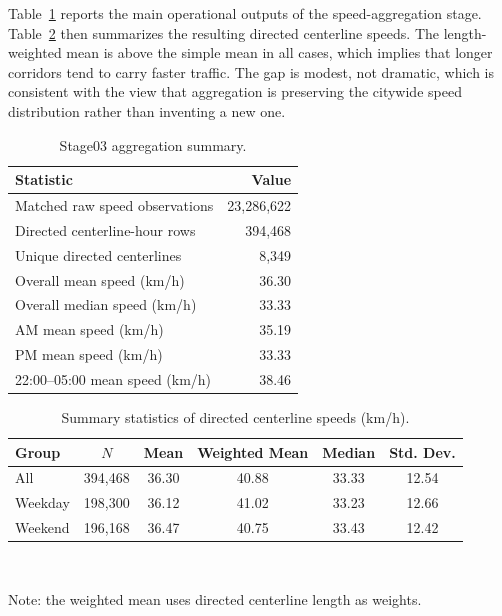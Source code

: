 \documentclass[12pt]{article}
\begin{document}
	Table~\ref{tab:stage03-summary} reports the main operational outputs of the speed-aggregation stage. Table~\ref{tab:centerline-speed-stats} then summarizes the resulting directed centerline speeds. The length-weighted mean is above the simple mean in all cases, which implies that longer corridors tend to carry faster traffic. The gap is modest, not dramatic, which is consistent with the view that aggregation is preserving the citywide speed distribution rather than inventing a new one.
	
	\begin{table}[h!]
		\centering
		\caption{Stage03 aggregation summary.}
		\label{tab:stage03-summary}
		\begin{tabular}{l r}
			\toprule
			Statistic & Value \\
			\midrule
			Matched raw speed observations & 23,286,622 \\
			Directed centerline-hour rows & 394,468 \\
			Unique directed centerlines & 8,349 \\
			Overall mean speed (km/h) & 36.30 \\
			Overall median speed (km/h) & 33.33 \\
			AM mean speed (km/h) & 35.19 \\
			PM mean speed (km/h) & 33.33 \\
			22:00--05:00 mean speed (km/h) & 38.46 \\
			\bottomrule
		\end{tabular}
	\end{table}
	
	\begin{table}[h!]
		\centering
		\caption{Summary statistics of directed centerline speeds (km/h).}
		\label{tab:centerline-speed-stats}
		\begin{tabular}{lccccc}
			\toprule
			Group & $N$ & Mean & Weighted Mean & Median & Std. Dev. \\
			\midrule
			All & 394,468 & 36.30 & 40.88 & 33.33 & 12.54 \\
			Weekday & 198,300 & 36.12 & 41.02 & 33.23 & 12.66 \\
			Weekend & 196,168 & 36.47 & 40.75 & 33.43 & 12.42 \\
			\bottomrule
		\end{tabular} \\
		\vspace{0.3em}
		\begin{minipage}{\textwidth}
			\footnotesize
			\raggedright
			Note: the weighted mean uses directed centerline length as weights.
		\end{minipage}
	\end{table}
	
\end{document}
